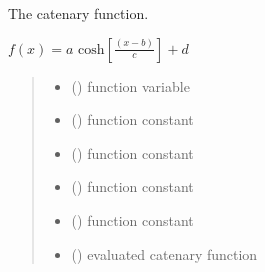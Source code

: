 \documentclass[letterpaper,10pt,english]{sphinxmanual}
\begin{document}

\begin{fulllineitems}
\label{\detokenize{01_utils:skinoptics.utils.catenary}}
\pysigstartsignatures
{}
\pysigstopsignatures
\sphinxAtStartPar
The catenary function.

\sphinxAtStartPar
\(f(x) = a \mbox{ cosh}\left[\frac{(x - b)}{c}\right] + d\)
\begin{quote}\begin{description}
\begin{itemize}
\item {} 
\sphinxAtStartPar
{} () \textendash{} function variable

\item {} 
\sphinxAtStartPar
{} () \textendash{} function constant

\item {} 
\sphinxAtStartPar
{} () \textendash{} function constant

\item {} 
\sphinxAtStartPar
{} () \textendash{} function constant

\item {} 
\sphinxAtStartPar
{} () \textendash{} function constant

\end{itemize}

\sphinxAtStartPar
\begin{itemize}
\item {} 
\sphinxAtStartPar
{} () \textendash{} evaluated catenary function

\end{itemize}


\end{description}\end{quote}

\end{fulllineitems}
\end{document}
